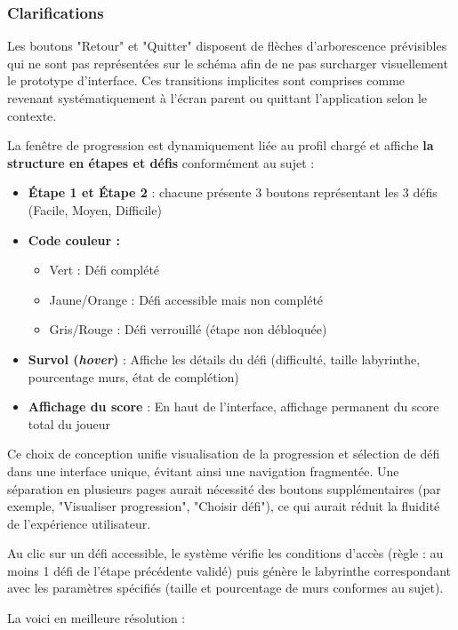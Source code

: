 \documentclass{butexFR}
\begin{document}
\subsubsection{Clarifications}

Les boutons "Retour" et "Quitter" disposent de flèches d'arborescence prévisibles qui ne sont pas représentées sur le schéma afin de ne pas surcharger visuellement le prototype d'interface. Ces transitions implicites sont comprises comme revenant systématiquement à l'écran parent ou quittant l'application selon le contexte.

La fenêtre de progression est dynamiquement liée au profil chargé et affiche \textbf{la structure en étapes et défis} conformément au sujet :

\begin{itemize}
    \item \textbf{Étape 1 et Étape 2} : chacune présente 3 boutons représentant les 3 défis (Facile, Moyen, Difficile)
    \item \textbf{Code couleur :}
    \begin{itemize}
        \item Vert : Défi complété
        \item Jaune/Orange : Défi accessible mais non complété
        \item Gris/Rouge : Défi verrouillé (étape non débloquée)
    \end{itemize}
    \item \textbf{Survol (\textit{hover})} : Affiche les détails du défi (difficulté, taille labyrinthe, pourcentage murs, état de complétion)
    \item \textbf{Affichage du score} : En haut de l'interface, affichage permanent du score total du joueur
\end{itemize}

Ce choix de conception unifie visualisation de la progression et sélection de défi dans une interface unique, évitant ainsi une navigation fragmentée. Une séparation en plusieurs pages aurait nécessité des boutons supplémentaires (par exemple, "Visualiser progression", "Choisir défi"), ce qui aurait réduit la fluidité de l'expérience utilisateur.

Au clic sur un défi accessible, le système vérifie les conditions d'accès (règle : au moins 1 défi de l'étape précédente validé) puis génère le labyrinthe correspondant avec les paramètres spécifiés (taille et pourcentage de murs conformes au sujet).

La voici en meilleure résolution :
\end{document}
